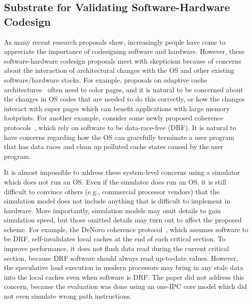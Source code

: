 \documentclass[conference]{IEEEtran}
\begin{document}
\subsection{Substrate for Validating Software-Hardware Codesign}

As many recent research proposals show, increasingly people have come to appreciate the importance of codesigning software and hardware.
However, these software-hardware codesign proposals meet with skepticism because of concerns about the interaction of architectural changes with the OS and other existing software/hardware stacks.
For example, proposals on adaptive cache architectures~\cite{Jigsaw} often need to color pages, and it is natural to be concerned about the changes in OS codes that are needed to do this correctly, or how the changes interact with super pages which can benefit applications with large memory footprints.
For another example, consider some newly proposed coherence protocols~\cite{DeNoVo}, which rely on software to be data-race-free (DRF). It is natural to have concerns regarding how the OS can gracefully terminate a user program that has data races and clean up polluted cache states caused by the user program.

It is almost impossible to address these system-level concerns using a simulator which does not run an OS.
Even if the simulator does run an OS, it is still difficult to convince others (e.g., commercial processor vendors) that the simulation model does not include anything that is difficult to implement in hardware.
More importantly, simulation models may omit details to gain simulation speed, but those omitted details may turn out to affect the proposed scheme.
For example, the DeNovo coherence protocol~\cite{DeNoVo}, which assumes software to be DRF, self-invalidates local caches at the end of each critical section.
To improve performance, it does not flush data read during the current critical section, because DRF software should always read up-to-date values.
However, the speculative load execution in modern processors may bring in any stale data into the local caches even when software is DRF.
The paper did not address this concern, because the evaluation was done using an one-IPC core model which did not even simulate wrong path instructions.
\end{document}
